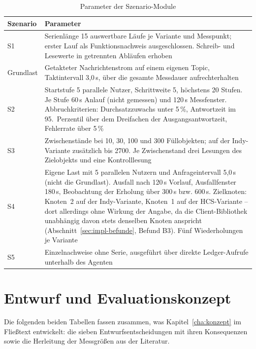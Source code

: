 \begin{table}[htbp]
\renewcommand{\arraystretch}{1.3}
\footnotesize
  \centering
  \caption{Parameter der Szenario-Module}
  \label{tab:impl-szenarioparameter}
  \begin{tabular}{p{} p{}}
    \toprule
    \textbf{Szenario} & \textbf{Parameter} \\
    \midrule
    S1 & Serienlänge 15 auswertbare Läufe je Variante und Messpunkt; erster Lauf als Funktionsnachweis ausgeschlossen. Schreib- und Lesewerte in getrennten Abläufen erhoben \\
    Grundlast & Getakteter Nachrichtenstrom auf einem eigenen Topic, Taktintervall 3,0\,s, über die gesamte Messdauer aufrechterhalten \\
    S2 & Startstufe 5 parallele Nutzer, Schrittweite 5, höchstens 20 Stufen. Je Stufe 60\,s Anlauf (nicht gemessen) und 120\,s Messfenster. Abbruchkriterien: Durchsatzzuwachs unter 5\,\%, Antwortzeit im 95.~Perzentil über dem Dreifachen der Ausgangsantwortzeit, Fehlerrate über 5\,\% \\
    S3 & Zwischenstände bei 10, 30, 100 und 300 Füllobjekten; auf der Indy-Variante zusätzlich bis 2700. Je Zwischenstand drei Lesungen des Zielobjekts und eine Kontrolllesung \\
    S4 & Eigene Last mit 5 parallelen Nutzern und Anfrageintervall 5,0\,s (nicht die Grundlast). Ausfall nach 120\,s Vorlauf, Ausfallfenster 180\,s, Beobachtung der Erholung über 300\,s bzw. 600\,s. Zielknoten: Knoten~2 auf der Indy-Variante, Knoten~1 auf der HCS-Variante -- dort allerdings ohne Wirkung der Angabe, da die Client-Bibliothek unabhängig davon stets denselben Knoten anspricht (Abschnitt~\ref{sec:impl-befunde}, Befund B3). Fünf Wiederholungen je Variante \\
    S5 & Einzelnachweise ohne Serie, ausgeführt über direkte Ledger-Aufrufe unterhalb des Agenten \\
    \bottomrule
  \end{tabular}
\end{table}
\normalsize

\section{Entwurf und Evaluationskonzept}
\label{sec:app-entwurf}

Die folgenden beiden Tabellen fassen zusammen, was Kapitel~\ref{cha:konzept} im Fließtext entwickelt: die sieben Entwurfsentscheidungen mit ihren Konsequenzen sowie die Herleitung der Messgrößen aus der Literatur.

